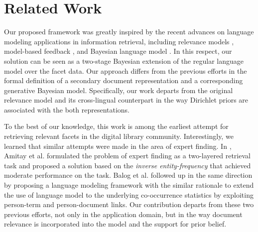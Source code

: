 
\section{Related Work}\label{s:related-work}

Our proposed framework was greatly inspired by the recent advances on language
modeling applications in information retrieval, including relevance models
\cite{lavrenko2001relevance,lavrenko2002cross-lingual}, model-based feedback
\cite{zhai2001language}, and Bayesian language model
\cite{zaragorza2003bayesian}.  In this respect, our solution can be seen as a
two-stage Bayesian extension of the regular language model over the facet data.
Our approach differs from the previous efforts in the formal definition of a
secondary document representation and a corresponding generative Bayesian
model.  Specifically, our work departs from the original relevance model
\cite{lavrenko2001relevance} and its cross-lingual counterpart
\cite{lavrenko2002cross-lingual} in the way Dirichlet priors are associated
with the both representations.

To the best of our knowledge, this work is among the earliest attempt for
retrieving relevant facets in the digital library community.  Interestingly, we
learned that similar attempts were made in the area of expert finding.  In
\cite{amitay2008finding}, Amitay et al. formulated the problem of expert
finding as a two-layered retrieval task and proposed a solution based on the
\emph{inverse entity-frequency} that achieved moderate performance on the task.
Balog et al. \cite{balog2009language} followed up in the same direction by
proposing a language modeling framework with the similar rationale to extend
the use of language model to the underlying co-occurrence statistics by
exploiting person-term and person-document links.  Our contribution departs
from these two previous efforts, not only in the application domain, but in the
way document relevance is incorporated into the model and the support for prior
belief.  
 
